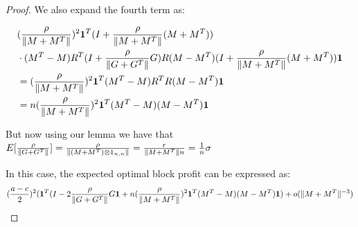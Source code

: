 \begin{proof}
We also expand the fourth term as:

\begin{align*}
    & (\frac{\rho}{\|M+M^T\|})^2 \mathbf{1}^T (I+ \frac{\rho}{\|M+M^T\|} (M+M^T))\\
    &\cdot (M^T - M) R^T (I + \frac{\rho}{\|G+G^T\|} G) R (M-M^T) (I+\frac{\rho}{\|M+M^T\|} (M+M^T))\mathbf{1} \\
    &= (\frac{\rho}{\|M+M^T\|})^2 \mathbf{1}^T (M^T- M) R^T R (M - M^T) \mathbf{1}  \\ 
    &= n (\frac{\rho}{\|M+M^T\|})^2 \mathbf{1}^T (M^T- M) (M - M^T) \mathbf{1} 
\end{align*}

But now using our lemma we have that $E[\frac{\rho}{\|G+G^T\|}] = \frac{\rho}{\| (M+M^T) \otimes 1_{n,n} \|} = \frac{r}{\|M+M^T\| n} = \frac{1}{n}\sigma  $

In this case, the expected optimal block profit can be expressed as: 
\begin{align*}
    (\frac{a-c}{2})^2 (\mathbf{1}^T (I - 2\frac{\rho}{\|G+G^T\|} G \mathbf{1} + n (\frac{\rho}{\|M+M^T\|})^2 \mathbf{1}^T (M^T -M )(M-M^T) \mathbf{1}) + o(\|M+M^T\|^{-3})
\end{align*}
\end{proof}
